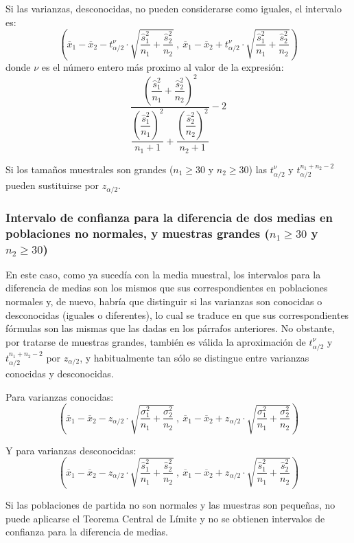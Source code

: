 Si las varianzas, desconocidas, no pueden considerarse como iguales, el intervalo es:
\[
\left( \overline{x}_{1}-\overline{x}_{2}-t_{\alpha /2}^{\nu }\cdot \sqrt{
\dfrac{\hat s_{1}^{2}}{n_{1}}+\dfrac{\hat s_{2}^{2}}{n_{2}}}\ ,\
\overline{x}_{1}-\overline{x}_{2}+t_{\alpha /2}^{\nu }\cdot \sqrt{\dfrac{
\hat s_{1}^{2}}{n_{1}}+\dfrac{\hat s_{2}^{2}}{n_{2}}}\right)
\]
donde $\nu$ es el número entero más proximo al valor de la
expresión:
\[
\dfrac{\left( \dfrac{\hat s_{1}^{2}}{n_{1}}+\dfrac{\hat s_{2}^{2}}{
n_{2}}\right) ^{2}}{\dfrac{\left(
\dfrac{\hat s_{1}^{2}}{n_{1}}\right)^{2}}{n_{1}+1}+\dfrac{\left(\dfrac{\hat s_{2}^{2}}{n_{2}}\right) ^{2}}{n_{2}+1}}-2
\]

Si los tamaños muestrales son grandes ($n_{1}\geq30$ y $n_{2}\geq30$) las $t_{\alpha /2}^{\nu}$ y $t_{\alpha
/2}^{n_{1}+n_{2}-2}$ pueden sustituirse por $z_{\alpha/2}$.

\subsubsection {Intervalo de confianza para la diferencia de dos medias en poblaciones no normales, y muestras grandes
($n_{1}\geq30$ y $n_{2}\geq30$)} 
En este caso, como ya sucedía con la media muestral, los intervalos para la diferencia de medias son los mismos que sus
correspondientes en poblaciones normales y, de nuevo, habría que distinguir si las varianzas son conocidas o desconocidas
(iguales o diferentes), lo cual se traduce en que sus correspondientes fórmulas son las mismas que las dadas en los
párrafos anteriores. No obstante, por tratarse de muestras grandes, también es válida la aproximación de $t_{\alpha
/2}^{\nu}$ y $t_{\alpha /2}^{n_{1}+n_{2}-2}$ por $z_{\alpha/2}$, y habitualmente tan sólo se distingue entre varianzas
conocidas y desconocidas.

Para varianzas conocidas:
\[
\left( \overline{x}_{1}-\overline{x}_{2}-z_{\alpha /2}\cdot \sqrt{\dfrac{
\sigma _{1}^{2}}{n_{1}}+\dfrac{\sigma _{2}^{2}}{n_{2}}}\ ,\ \overline{x}_{1}-
\overline{x}_{2}+z_{\alpha /2}\cdot \sqrt{\dfrac{\sigma _{1}^{2}}{n_{1}}+
\dfrac{\sigma _{2}^{2}}{n_{2}}}\right)
\]

Y para varianzas desconocidas:
\[
\left( \overline{x}_{1}-\overline{x}_{2}-z_{\alpha /2}\cdot \sqrt{
\dfrac{\hat s_{1}^{2}}{n_{1}}+\dfrac{\hat s_{2}^{2}}{n_{2}}}\ ,\
\overline{x}_{1}-\overline{x}_{2}+z_{\alpha /2}\cdot \sqrt{\dfrac{
\hat s_{1}^{2}}{n_{1}}+\dfrac{\hat s_{2}^{2}}{n_{2}}}\right)
\]

Si las poblaciones de partida no son normales y las muestras son pequeñas, no puede aplicarse el Teorema Central de
Límite y no se obtienen intervalos de confianza para la diferencia de medias.

